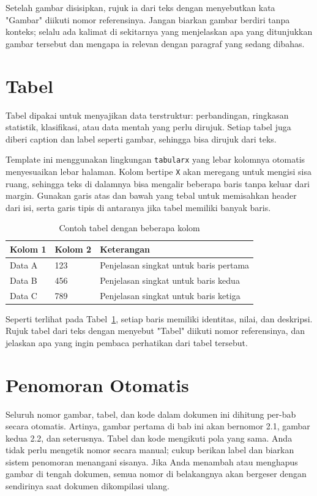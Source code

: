 Setelah gambar disisipkan, rujuk ia dari teks dengan menyebutkan kata "Gambar" diikuti nomor referensinya. Jangan biarkan gambar berdiri tanpa konteks; selalu ada kalimat di sekitarnya yang menjelaskan apa yang ditunjukkan gambar tersebut dan mengapa ia relevan dengan paragraf yang sedang dibahas.

\section{Tabel}
Tabel dipakai untuk menyajikan data terstruktur: perbandingan, ringkasan statistik, klasifikasi, atau data mentah yang perlu dirujuk. Setiap tabel juga diberi caption dan label seperti gambar, sehingga bisa dirujuk dari teks.

Template ini menggunakan lingkungan \texttt{tabularx} yang lebar kolomnya otomatis menyesuaikan lebar halaman. Kolom bertipe \texttt{X} akan meregang untuk mengisi sisa ruang, sehingga teks di dalamnya bisa mengalir beberapa baris tanpa keluar dari margin. Gunakan garis atas dan bawah yang tebal untuk memisahkan header dari isi, serta garis tipis di antaranya jika tabel memiliki banyak baris.

\begin{table}[H]
    \centering
    \caption{Contoh tabel dengan beberapa kolom}
    \label{tab:contoh}
    \begin{tabularx}{\textwidth}{| l | l | X |}
        \hline
        \textbf{Kolom 1} & \textbf{Kolom 2} & \textbf{Keterangan} \\ \hline
        Data A & 123 & Penjelasan singkat untuk baris pertama \\ \hline
        Data B & 456 & Penjelasan singkat untuk baris kedua \\ \hline
        Data C & 789 & Penjelasan singkat untuk baris ketiga \\ \hline
    \end{tabularx}
\end{table}

Seperti terlihat pada Tabel~\ref{tab:contoh}, setiap baris memiliki identitas, nilai, dan deskripsi. Rujuk tabel dari teks dengan menyebut "Tabel" diikuti nomor referensinya, dan jelaskan apa yang ingin pembaca perhatikan dari tabel tersebut.

\section{Penomoran Otomatis}
Seluruh nomor gambar, tabel, dan kode dalam dokumen ini dihitung per-bab secara otomatis. Artinya, gambar pertama di bab ini akan bernomor 2.1, gambar kedua 2.2, dan seterusnya. Tabel dan kode mengikuti pola yang sama. Anda tidak perlu mengetik nomor secara manual; cukup berikan label dan biarkan sistem penomoran menangani sisanya. Jika Anda menambah atau menghapus gambar di tengah dokumen, semua nomor di belakangnya akan bergeser dengan sendirinya saat dokumen dikompilasi ulang.
